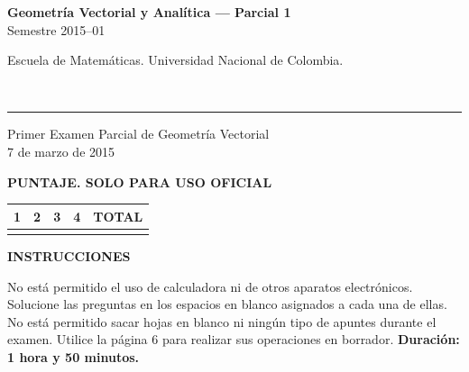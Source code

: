 \documentclass[11pt]{article}
\newcommand{\examheader}{%
  \noindent
  \begin{minipage}[t]{0.6\linewidth}
    {\small\bfseries Geometría Vectorial y Analítica --- Parcial 1}\\
    {\small Semestre 2015--01}
  \end{minipage}%
  \hfill
  \begin{minipage}[t]{0.35\linewidth}
    \raggedleft\small Escuela de Matemáticas. Universidad Nacional de Colombia.
  \end{minipage}\\[2pt]
  \rule{\linewidth}{0.6pt}
}
\begin{document}
\examheader

\begin{center}
{\Large Primer Examen Parcial de Geometría Vectorial}\\[4pt]
{\small 7 de marzo de 2015}
\end{center}

\vspace{10pt}
\textbf{PUNTAJE. SOLO PARA USO OFICIAL}

\begin{center}
\begin{tabular}{|c|c|c|c|c|}
\hline
1 & 2 & 3 & 4 & TOTAL \\
\hline
 & & & & \\
\hline
\end{tabular}
\end{center}

\vspace{10pt}
\textbf{INSTRUCCIONES}

No está permitido el uso de calculadora ni de otros aparatos electrónicos. Solucione las preguntas en los espacios en blanco asignados a cada una de ellas. No está permitido sacar hojas en blanco ni ningún tipo de apuntes durante el examen. Utilice la página 6 para realizar sus operaciones en borrador. \textbf{Duración: 1 hora y 50 minutos.}
\end{document}
